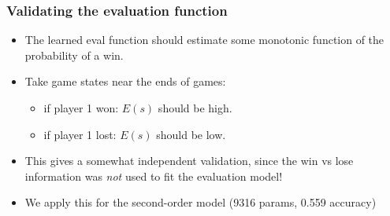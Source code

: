 \documentclass{beamer}
\begin{document}
\begin{frame}
\frametitle{Validating the evaluation function}
\begin{itemize}
\item The learned eval function should estimate some monotonic function of the probability of a win.
\item Take game states near the ends of games:
\begin{itemize}
\item if player 1 won: $E(s)$ should be high.
\item if player 1 lost: $E(s)$ should be low.
\end{itemize}
\item This gives a somewhat independent validation, since the win vs lose information was \emph{not} used to fit the evaluation model!
\item We apply this for the second-order model (9316 params, 0.559 accuracy)
\end{itemize}
\end{frame}
\end{document}
